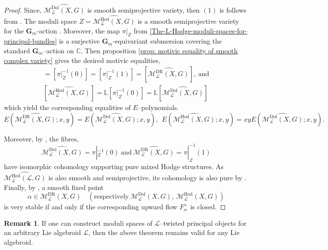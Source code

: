 \documentclass[12pt,reqno]{amsart}
\numberwithin{equation}{subsection}
\theoremstyle{definition}
\newtheorem{rem}[equation]{Remark}
\theoremstyle{theorem}
\begin{document}
\begin{proof}
	 Since, $\widehat{\mathcal{M}_{\mathcal{L}}^{\text{Dol}}(X,G)}$ is smooth semiprojective variety, then  $(1)$ is follows from \cite[lemma 5.5]{Alfaya-Oliveire-2024}. The moduli space $Z=\widehat{\mathcal{M}_{\mathcal{L}}^{\text{Hod}}(X,G)}$ is a smooth semiprojective variety for the $\mathbf{G}_{m}$-action . Moreover, the map $\pi|_{Z}$ from \eqref{The-L-Hodge-moduli-spaces-for-principal-bundles} is a surjective $\mathbf{G}_{m}$-equivariant submersion covering the standard $\mathbf{G}_{m}$--action on $\mathbb{C}$. Then proposition \eqref{prop: motivic equality of smooth complex variety} gives the desired motivic equalities,
	\begin{gather*}
		[\widehat{\mathcal{M}_{\mathcal{L}}^{\text{Dol}}(X,G)}]=[\pi|_{Z}^{-1}(0)] = [\pi|_{Z}^{-1}(1)]=[\widehat{\mathcal{M}_{\mathcal{L}}^{\text{DR}}(X,G)}], \ \text{and} \\ [\widehat{\mathcal{M}_{\mathcal{L}}^{\text{Hod}}(X,G)}]=\mathbb{L}[\pi|_{Z}^{-1}(0)]=\mathbb{L}[\widehat{\mathcal{M}_{\mathcal{L}}^{\text{Dol}}(X,G)}]
	\end{gather*}
	which yield the corresponding equalities of $E$--polynomials.
	\[E(\widehat{\mathcal{M}_{\mathcal{L}}^{\text{DR}}(X,G)};x,y) = E(\widehat{\mathcal{M}_{\mathcal{L}}^{\text{Dol}}(X,G)};x,y), \ \  E(\widehat{\mathcal{M}_{\mathcal{L}}^{\text{Hod}}(X,G)};x,y) = xyE(\widehat{\mathcal{M}_{\mathcal{L}}^{\text{Dol}}(X,G)};x,y).\]
	
	Moreover, by \cite[Corollary 1.3.3]{T.Hausel-F. Villegas}, the fibres, $$\widehat{\mathcal{M}_{\mathcal{L}}^{\text{Dol}}(X,G)}=\pi|_{Z}^{-1}(0) \ \text{and} \ \widehat{\mathcal{M}_{\mathcal{L}}^{\text{DR}}(X,G)} = \pi|_{Z}^{-1}(1)$$ have isomorphic cohomology supporting pure mixed Hodge structures. As $\widehat{\mathcal{M}_{\mathcal{L}}^{\text{Hod}}(\mathcal{L},G)}$ is also smooth and semiprojective, its cohomology is also pure by \cite[Corollary 1.3.2]{T.Hausel-F. Villegas}. Finally, by \cite[Proposition 2.14]{Hausel-Hitchin-2022}, a smooth fixed point 
	\[
	\alpha \in \mathcal{M}^{\mathrm{DR}}_{\mathcal{L}}(X,G)
	\quad 
	\left(\text{respectively} \ 
	\mathcal{M}^{\mathrm{Dol}}_{\mathcal{L}}(X,G),\ 
	\mathcal{M}^{\mathrm{Hod}}_{\mathcal{L}}(X,G)
	\right)
	\]
	is very stable if and only if the corresponding upward flow \(F^{+}_{\alpha}\) is closed.
\end{proof}
\begin{rem}
If one can construct moduli spaces of \(\mathcal{L}\)--twisted principal objects for an arbitrary Lie algebroid \(\mathcal{L}\), then the above theorem remains valid for any Lie algebroid.
\end{rem}
\end{document}
